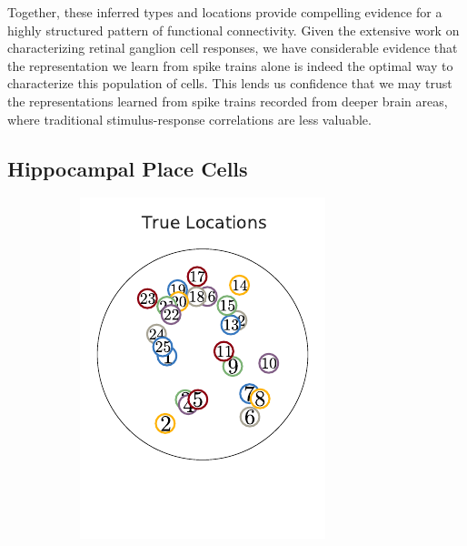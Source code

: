 Together, these inferred types and locations provide 
compelling evidence for a highly structured pattern of functional 
connectivity. Given the extensive work on characterizing retinal 
ganglion cell responses, we have considerable evidence that the 
representation we learn from spike trains alone is indeed the 
optimal way to characterize this population of cells. This 
lends us confidence that we may trust the representations learned from 
spike trains recorded from deeper brain areas, where traditional 
stimulus-response correlations are less valuable.

\subsection{Hippocampal Place Cells}
\label{sec:hipp}

\begin{figure}[t!]
  \centering
  \vspace{-.2in}
  \begin{subfigure}[b]{1.75in}
    \centering
    \caption{}
    \vspace{-.2in}
    \includegraphics[width=\textwidth]{figures/ch5/hipp_true_locations.pdf}

\end{subfigure}
\end{figure}
